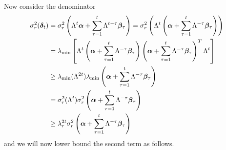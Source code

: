 \documentclass[10pt]{article}
\newcommand{\norm}[1]{\left\|#1\right\|}
\begin{document}


Now consider the denominator
\begin{align*}
\sigma_r^2(\bm{\delta}_t) &= \sigma_r^2\left(\Lambda^t \bm{\alpha} + \sum_{\tau=1}^t \Lambda^{t-\tau} \bm{\beta}_\tau\right)  = \sigma_r^2\left(\Lambda^t \left(\bm{\alpha} + \sum_{\tau=1}^t \Lambda^{-\tau} \bm{\beta}_\tau\right)\right) \\ 
&= \lambda_{\min} \left[\Lambda^t  \left(\bm{\alpha} + \sum_{\tau=1}^t \Lambda^{-\tau} \bm{\beta}_\tau\right) \left(\bm{\alpha} + \sum_{\tau=1}^t \Lambda^{-\tau} \bm{\beta}_\tau\right)^T  \Lambda^t\right] \\
&\geq \lambda_{\min}(\Lambda^{2t}) \lambda_{\min}\left(\bm{\alpha} + \sum_{\tau=1}^t \Lambda^{-\tau} \bm{\beta}_\tau\right) \\
&= \sigma_r^2(\Lambda^t) \sigma_r^2\left(\bm{\alpha} + \sum_{\tau=1}^t \Lambda^{-\tau} \bm{\beta}_\tau\right) \\
&\geq \lambda_r^{2t} \sigma_r^2\left(\bm{\alpha} + \sum_{\tau=1}^t \Lambda^{-\tau} \bm{\beta}_\tau\right) \\
\end{align*}
and we will now lower bound the second term as follows. 
\end{document}
